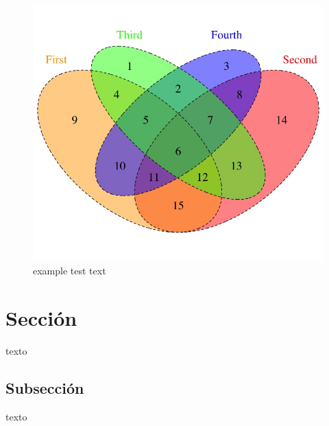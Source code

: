 \begin{figure}
\includegraphics[scale=0.15]{figures/Venn}
\caption{example test text}
\label{fig:Venn}
\end{figure}

\lipsum[1]

\section{Sección}
texto

\subsection{Subsección}

texto



